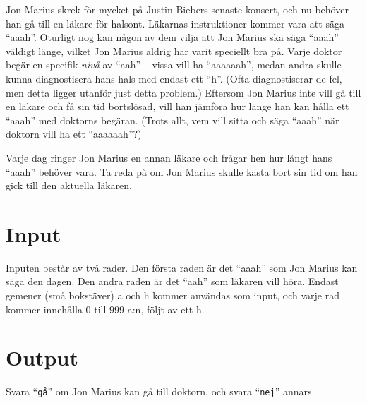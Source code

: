 



Jon Marius skrek för mycket på Justin Biebers senaste konsert, och nu behöver han 
gå till en läkare för halsont. Läkarnas instruktioner kommer vara att säga ``aaah''.
Oturligt nog kan någon av dem vilja att Jon Marius ska säga ``aaah'' väldigt länge, vilket
Jon Marius aldrig har varit speciellt bra på. Varje doktor begär en specifik \emph{nivå}
av ``aah'' -- vissa vill ha ``aaaaaah'', medan andra skulle kunna diagnostisera
hans hals med endast ett ``h''. (Ofta diagnostiserar de fel, men detta ligger
utanför just detta problem.) Eftersom Jon Marius inte vill gå till en läkare
och få sin tid bortslösad, vill han jämföra hur länge han kan hålla ett ``aaah''
med doktorns begäran. (Trots allt, vem vill sitta och säga ``aaah'' när doktorn
vill ha ett ``aaaaaah''?)

Varje dag ringer Jon Marius en annan läkare och frågar hen hur långt hans
``aaah'' behöver vara. Ta reda på om Jon Marius skulle kasta bort sin tid
om han gick till den aktuella läkaren.

\section*{Input}
Inputen består av två rader. Den första raden är det ``aaah'' som Jon Marius
kan säga den dagen. Den andra raden är det ``aah'' som läkaren vill höra.
Endast gemener (små bokstäver) a och h kommer användas som input, och
varje rad kommer innehålla $0$ till $999$ a:n, följt av ett h.

\section*{Output}
Svara ``{\tt gå}'' om Jon Marius kan gå till doktorn, och svara ``{\tt nej}'' annars.

